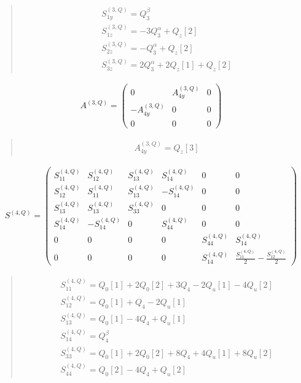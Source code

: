 \documentclass[fleqn,10pt]{jsarticle}
\begin{document}
\begin{quote}
\begin{align*}
& S^{(3,Q)}_{1y} = Q_{3}^{\beta} \\
& S^{(3,Q)}_{1z} = - 3 Q_{3}^{\alpha} + Q_{z}[2] \\
& S^{(3,Q)}_{2z} = - Q_{3}^{\alpha} + Q_{z}[2] \\
& S^{(3,Q)}_{3z} = 2 Q_{3}^{\alpha} + 2 Q_{z}[1] + Q_{z}[2]
\end{align*}
\end{quote}
\begin{align*}
A^{(3,Q)} = \begin{pmatrix} 0 & A^{(3,Q)}_{4y} & 0 \\ - A^{(3,Q)}_{4y} & 0 & 0 \\ 0 & 0 & 0 \end{pmatrix}
\end{align*}
\begin{quote}
\begin{align*}
& A^{(3,Q)}_{4y} = Q_{z}[3]
\end{align*}
\end{quote}
\begin{align*}
S^{(4,Q)} = \begin{pmatrix} S^{(4,Q)}_{11} & S^{(4,Q)}_{12} & S^{(4,Q)}_{13} & S^{(4,Q)}_{14} & 0 & 0 \\ S^{(4,Q)}_{12} & S^{(4,Q)}_{11} & S^{(4,Q)}_{13} & - S^{(4,Q)}_{14} & 0 & 0 \\ S^{(4,Q)}_{13} & S^{(4,Q)}_{13} & S^{(4,Q)}_{33} & 0 & 0 & 0 \\ S^{(4,Q)}_{14} & - S^{(4,Q)}_{14} & 0 & S^{(4,Q)}_{44} & 0 & 0 \\ 0 & 0 & 0 & 0 & S^{(4,Q)}_{44} & S^{(4,Q)}_{14} \\ 0 & 0 & 0 & 0 & S^{(4,Q)}_{14} & \frac{S^{(4,Q)}_{11}}{2} - \frac{S^{(4,Q)}_{12}}{2} \end{pmatrix}
\end{align*}
\begin{quote}
\begin{align*}
& S^{(4,Q)}_{11} = Q_{0}[1] + 2 Q_{0}[2] + 3 Q_{4} - 2 Q_{u}[1] - 4 Q_{u}[2] \\
& S^{(4,Q)}_{12} = Q_{0}[1] + Q_{4} - 2 Q_{u}[1] \\
& S^{(4,Q)}_{13} = Q_{0}[1] - 4 Q_{4} + Q_{u}[1] \\
& S^{(4,Q)}_{14} = Q_{4}^{\beta} \\
& S^{(4,Q)}_{33} = Q_{0}[1] + 2 Q_{0}[2] + 8 Q_{4} + 4 Q_{u}[1] + 8 Q_{u}[2] \\
& S^{(4,Q)}_{44} = Q_{0}[2] - 4 Q_{4} + Q_{u}[2]
\end{align*}
\end{quote}
\end{document}
